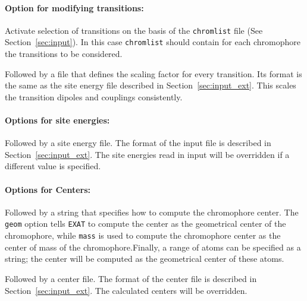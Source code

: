 \documentclass[a4paper,11pt]{article}
\begin{document}
\paragraph*{Option for modifying transitions:}
\begin{description}[labelsep=10pt, align=left, labelwidth=80pt,labelindent=0pt,leftmargin=90pt]
\item[\texttt{-{}-seltran}] Activate selection of transitions on the basis of the \texttt{chromlist} file (See Section~\ref{sec:input}). In this case \texttt{chromlist} should contain for each chromophore the transitions to be considered. 
\item[\texttt{-{}-scaletran}] Followed by a file that defines the scaling factor for every transition. Its format is the same as the site energy file  described in Section~\ref{sec:input_ext}. This scales the transition dipoles and couplings consistently.
\end{description}

\paragraph*{Options for site energies:}
\begin{description}[labelsep=10pt, align=left, labelwidth=90pt,labelindent=0pt,leftmargin=100pt]
\item[\texttt{-{}-insite,-{}-site}] Followed by a site energy file. The format of the input file is described in Section~\ref{sec:input_ext}. The site energies read in input will be overridden if a different value is specified.
\end{description}

\paragraph*{Options for Centers:}
\begin{description}[labelsep=10pt, align=left, labelwidth=80pt,labelindent=0pt,leftmargin=90pt]
\item[\texttt{-{}-cent}] Followed by a string that specifies how to compute the chromophore center. The \texttt{geom} option tells \texttt{EXAT} to compute the center as the geometrical center of the chromophore, while \texttt{mass} is used to compute the chromophore center as the center of mass of the chromophore.Finally, a range of atoms can be specified as a string; the center will be computed as the geometrical center of these atoms. 
\item[\texttt{-{}-incent}] Followed by a center file. The format of the center file is described in Section~\ref{sec:input_ext}. The calculated centers will be overridden.
\end{description}
\end{document}

